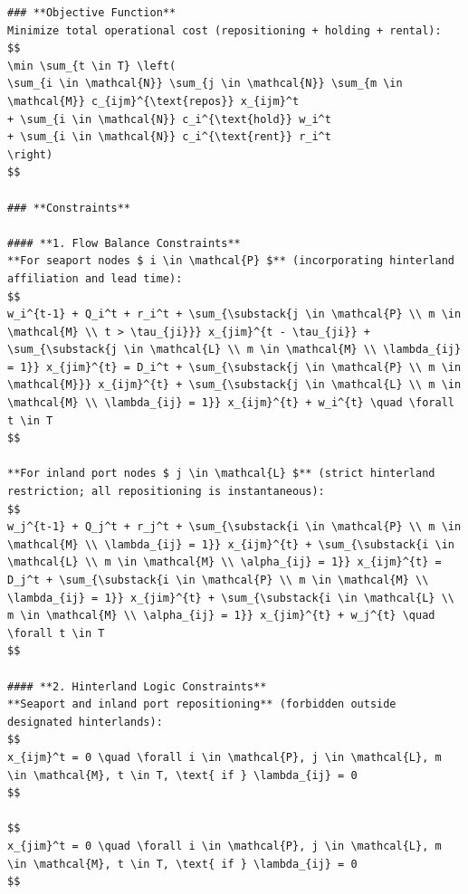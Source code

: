 \documentclass[preprint,12pt]{elsarticle}
\begin{document}
\begin{nolinenumbers}
\begin{promptbox}
\begin{lstlisting}[style=prompttemplate]
### **Objective Function**
Minimize total operational cost (repositioning + holding + rental):
$$
\min \sum_{t \in T} \left(
\sum_{i \in \mathcal{N}} \sum_{j \in \mathcal{N}} \sum_{m \in \mathcal{M}} c_{ijm}^{\text{repos}} x_{ijm}^t
+ \sum_{i \in \mathcal{N}} c_i^{\text{hold}} w_i^t
+ \sum_{i \in \mathcal{N}} c_i^{\text{rent}} r_i^t
\right)
$$

### **Constraints**

#### **1. Flow Balance Constraints**
**For seaport nodes $ i \in \mathcal{P} $** (incorporating hinterland affiliation and lead time):
$$
w_i^{t-1} + Q_i^t + r_i^t + \sum_{\substack{j \in \mathcal{P} \\ m \in \mathcal{M} \\ t > \tau_{ji}}} x_{jim}^{t - \tau_{ji}} + \sum_{\substack{j \in \mathcal{L} \\ m \in \mathcal{M} \\ \lambda_{ij} = 1}} x_{jim}^{t} = D_i^t + \sum_{\substack{j \in \mathcal{P} \\ m \in \mathcal{M}}} x_{ijm}^{t} + \sum_{\substack{j \in \mathcal{L} \\ m \in \mathcal{M} \\ \lambda_{ij} = 1}} x_{ijm}^{t} + w_i^{t} \quad \forall t \in T
$$

**For inland port nodes $ j \in \mathcal{L} $** (strict hinterland restriction; all repositioning is instantaneous):
$$
w_j^{t-1} + Q_j^t + r_j^t + \sum_{\substack{i \in \mathcal{P} \\ m \in \mathcal{M} \\ \lambda_{ij} = 1}} x_{ijm}^{t} + \sum_{\substack{i \in \mathcal{L} \\ m \in \mathcal{M} \\ \alpha_{ij} = 1}} x_{ijm}^{t} = D_j^t + \sum_{\substack{i \in \mathcal{P} \\ m \in \mathcal{M} \\ \lambda_{ij} = 1}} x_{jim}^{t} + \sum_{\substack{i \in \mathcal{L} \\ m \in \mathcal{M} \\ \alpha_{ij} = 1}} x_{jim}^{t} + w_j^{t} \quad \forall t \in T
$$

#### **2. Hinterland Logic Constraints**
**Seaport and inland port repositioning** (forbidden outside designated hinterlands):
$$
x_{ijm}^t = 0 \quad \forall i \in \mathcal{P}, j \in \mathcal{L}, m \in \mathcal{M}, t \in T, \text{ if } \lambda_{ij} = 0
$$

$$
x_{jim}^t = 0 \quad \forall i \in \mathcal{P}, j \in \mathcal{L}, m \in \mathcal{M}, t \in T, \text{ if } \lambda_{ij} = 0
$$


\end{lstlisting}
\end{promptbox}
\end{nolinenumbers}
\end{document}
